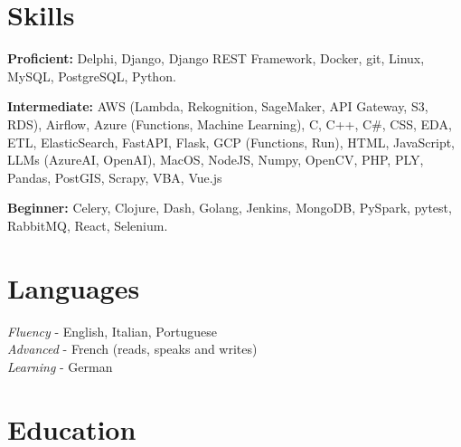 \documentclass[10pt]{article} %
\begin{document}

\section{Skills}
\rule{0mm}{2mm}\textbf{Proficient:} Delphi, Django, Django REST Framework, Docker, git, Linux, MySQL, PostgreSQL, Python.\\
\rule{0mm}{3mm}\textbf{Intermediate:} AWS (Lambda, Rekognition, SageMaker, API Gateway, S3, RDS), Airflow, Azure (Functions, Machine Learning), C, C++, C\#, CSS, EDA, ETL, ElasticSearch, FastAPI, Flask, GCP (Functions, Run), HTML, JavaScript, LLMs (AzureAI, OpenAI), MacOS, NodeJS, Numpy, OpenCV, PHP, PLY, Pandas, PostGIS, Scrapy, VBA, Vue.js\\
\rule{0mm}{3mm}\textbf{Beginner:} Celery, Clojure, Dash, Golang, Jenkins, MongoDB, PySpark, pytest, RabbitMQ, React, Selenium.


\section{Languages}
{
\textit{Fluency} - English, Italian, Portuguese\\
\textit{Advanced} - French (reads, speaks and writes)\\
\textit{Learning} - German\\
}


\section{Education}

\end{document}

